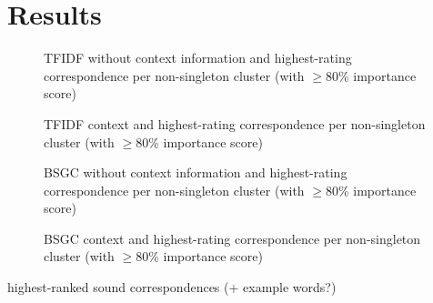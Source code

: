 \documentclass[a4paper]{article}
\begin{document}
\section{Results}

\begin{figure}
  
  \caption{TFIDF without context information and highest-rating correspondence per non-singleton cluster (with $\geq$80\% importance score)}
  \label{fig:tfidf-nocontext}
\end{figure}

\begin{figure}
  
  \caption{TFIDF context and highest-rating correspondence per non-singleton cluster (with $\geq$80\% importance score)}
  \label{fig:tfidf-context}
\end{figure}

\begin{figure}
  
  \caption{BSGC without context information and highest-rating correspondence per non-singleton cluster (with $\geq$80\% importance score)}
  \label{fig:bsgc-nocontext}
\end{figure}

\begin{figure}
  
  \caption{BSGC context and highest-rating correspondence per non-singleton cluster (with $\geq$80\% importance score)}
  \label{fig:bsgc-context}
\end{figure}


highest-ranked sound correspondences
(+ example words?)
\end{document}
